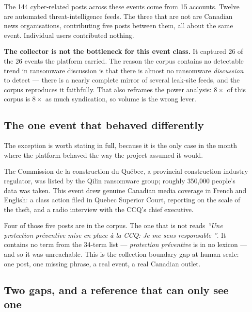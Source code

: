 \documentclass[11pt]{article}
\begin{document}
\medskip

The 144 cyber-related posts across these events come from 15 accounts. Twelve
are automated threat-intelligence feeds. The three that are not are Canadian
news organisations, contributing five posts between them, all about the same
event. Individual users contributed nothing.

\begin{keybox}
\textbf{The collector is not the bottleneck for this event class.} It captured
26 of the 26 events the platform carried. The reason the corpus contains no
detectable trend in ransomware discussion is that there is almost no ransomware
\emph{discussion} to detect --- there is a nearly complete mirror of several
leak-site feeds, and the corpus reproduces it faithfully. That also reframes
the power analysis: $8\times$ of this corpus is $8\times$ as much syndication,
so volume is the wrong lever.
\end{keybox}

\subsection{The one event that behaved differently}

The exception is worth stating in full, because it is the only case in the
month where the platform behaved the way the project assumed it would.

The Commission de la construction du Qu\'ebec, a provincial construction
industry regulator, was listed by the Qilin ransomware group; roughly 350{,}000
people's data was taken. This event drew genuine Canadian media coverage in
French and English: a class action filed in Quebec Superior Court, reporting on
the scale of the theft, and a radio interview with the CCQ's chief executive.

Four of those five posts are in the corpus. The one that is not reads
\emph{``Une protection pr\'eventive mise en place \`a la CCQ: \guillemotleft Je
me sens responsable \guillemotright''}. It contains no term from the 34-term
list --- \emph{protection pr\'eventive} is in no lexicon --- and so it was
unreachable. This is the collection-boundary gap at human scale: one post, one
missing phrase, a real event, a real Canadian outlet.

\subsection{Two gaps, and a reference that can only see one}
\end{document}
